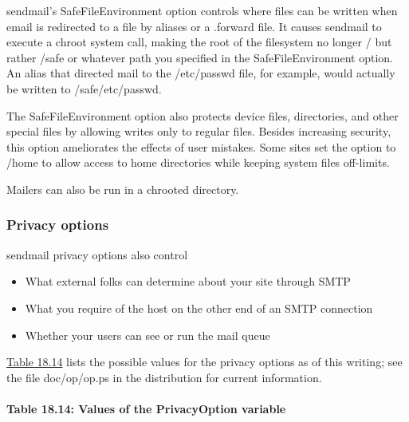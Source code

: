 
{sendmail}'s {SafeFileEnvironment} option controls where files can be
written when email is redirected to a file by {aliases} or a {.forward}
file. It causes {sendmail} to execute a {chroot} system call, making the
root of the filesystem no longer {/} but rather {/safe} or whatever path
you specified in the {SafeFileEnvironment} option. An alias that
directed mail to the {/etc/passwd} file, for example, would actually be
written to {/safe/etc/passwd}.

The {SafeFileEnvironment} option also protects device files,
directories, and other special files by allowing writes only to regular
files. Besides increasing security, this option ameliorates the effects
of user mistakes. Some sites set the option to {/home} to allow access
to home directories while keeping system files off-limits.

Mailers can also be run in a {chroot}ed directory.

\subsubsection[Privacy
options]{\texorpdfstring{Priv\protect\hypertarget{part0026_split_038.htmlux5cux23_idTextAnchor1109}{}{}acy
options}{Privacy options}}

\protect\hypertarget{part0026_split_038.htmlux5cux23_idIndexMarker2585}{}{}\protect\hypertarget{part0026_split_038.htmlux5cux23_idIndexMarker2586}{}{}{sendmail}
privacy options also control

\begin{itemize}
\tightlist
\item
  What external folks can determine about your site through SMTP
\item
  What you require of the host on the other end of an SMTP connection
\item
  Whether your users can see or run the mail queue
\end{itemize}

\protect\hyperlink{part0026_split_038.htmlux5cux23_idTextAnchor1110}{Table
18.14} lists the possible values for the privacy options as of this
writing; see the file {doc/op/op.ps} in the distribution for current
information.

\paragraph[{Table 18.14: }Values of the {PrivacyOption}
variable]{\texorpdfstring{{Table 18.14:
}\protect\hypertarget{part0026_split_038.htmlux5cux23_idIndexMarker2587}{}{}\protect\hypertarget{part0026_split_038.htmlux5cux23_idTextAnchor1110}{}{}\protect\hypertarget{part0026_split_038.htmlux5cux23_idTextAnchor1111}{}{}Values
of the {PrivacyOption}
variable}{Table 18.14: Values of the PrivacyOption variable}}

